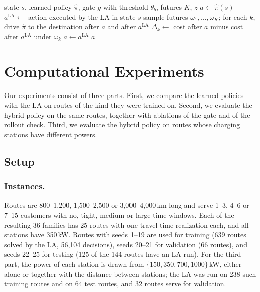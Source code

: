 \documentclass[runningheads]{llncs}
\begin{document}
\begin{algorithm}[t]
\caption{One decision of the hybrid policy at stop $i$}
\label{alg:hybrid}
\begin{algorithmic}[1]
\Require state $s$, learned policy $\hat\pi$, gate $g$ with threshold $\theta_b$, futures $K$, $z$
\State $a\gets\hat\pi(s)$ 
  \State $a^{\mathrm{LA}}\gets$ action executed by the LA in state $s$
    \State sample futures $\omega_1,\dots,\omega_K$; for each $k$, drive $\hat\pi$ to the destination after $a$ and after $a^{\mathrm{LA}}$
    \State $\Delta_k\gets$ cost after $a$ minus cost after $a^{\mathrm{LA}}$ under $\omega_k$
     $a\gets a^{\mathrm{LA}}$ \EndIf
  \EndIf
\EndIf
\State \Return $a$
\end{algorithmic}
\end{algorithm}

\section{Computational Experiments}
\label{sec:exp}

Our experiments consist of three parts. First, we compare the learned policies
with the LA on routes of the kind they were trained on. Second, we evaluate the
hybrid policy on the same routes, together with ablations of the gate and of
the rollout check. Third, we evaluate the hybrid policy on routes whose
charging stations have different powers.

\subsection{Setup}
\label{sec:setup}

\subsubsection{Instances.}
Routes are 800--1{,}200, 1{,}500--2{,}500 or 3{,}000--4{,}000\,km long and
serve 1--3, 4--6 or 7--15 customers with no, tight, medium or large time
windows. Each of the resulting 36 families has 25 routes with one travel-time
realization each, and all stations have 350\,kW. Routes with seeds 1--19 are
used for training (639 routes solved by the LA, 56{,}104 decisions), seeds
20--21 for validation (66 routes), and seeds 22--25 for testing (125 of the
144 routes have an LA run). For the third part, the power of each station is
drawn from $\{150,350,700,1000\}$\,kW, either alone or together with the
distance between stations; the LA was run on 238 such training routes and on
64 test routes, and 32 routes serve for validation.
\end{document}
